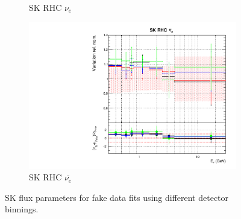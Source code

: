 \begin{figure}[t]
\begin{subfigure}{0.45\textwidth}
  \caption{SK RHC $\nu_e$}
\end{subfigure}
\begin{subfigure}{0.45\textwidth}
  \centering
  \includegraphics[width=0.75\linewidth]{figs/detcovbinflux_15}
  \caption{SK RHC $\bar{\nu_e}$}
\end{subfigure}
\caption{SK flux parameters for fake data fits using different detector binnings.}
\label{fig:detcovbinfluxSK}
\end{figure}

